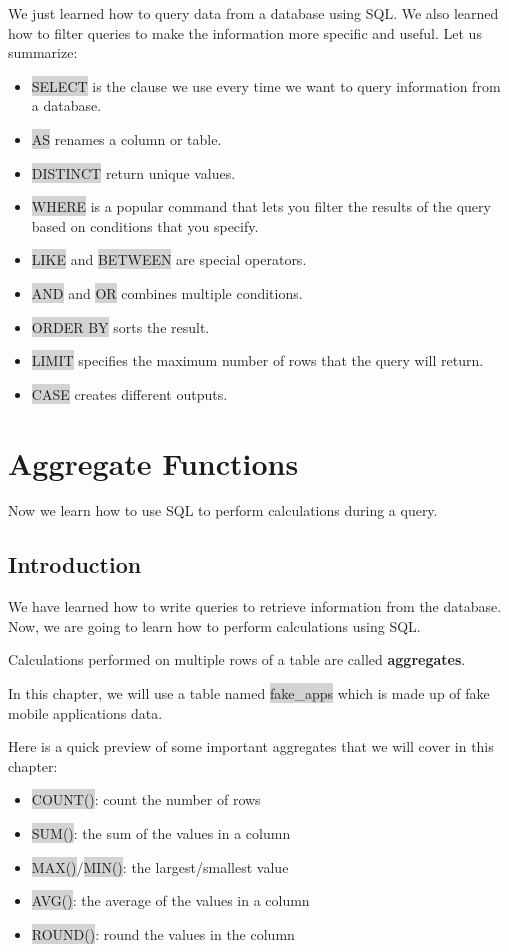 \documentclass[11pt]{article}
\begin{document}
{{We just learned how to query data from a database using SQL. We also learned how to filter queries to make the information more specific and useful. Let us summarize:
\begin{itemize}[leftmargin = *]
\item \colorbox{lightgray}{SELECT} is the clause we use every time we want to query information from a database.
\item \colorbox{lightgray}{AS} renames a column or table.
\item \colorbox{lightgray}{DISTINCT} return unique values.
\item \colorbox{lightgray}{WHERE} is a popular command that lets you filter the results of the query based on conditions that you specify.
\item \colorbox{lightgray}{LIKE} and \colorbox{lightgray}{BETWEEN} are special operators.
\item \colorbox{lightgray}{AND} and \colorbox{lightgray}{OR} combines multiple conditions.
\item \colorbox{lightgray}{ORDER BY} sorts the result.
\item \colorbox{lightgray}{LIMIT} specifies the maximum number of rows that the query will return.
\item \colorbox{lightgray}{CASE} creates different outputs.
\end{itemize}

\newpage
\section{Aggregate Functions}
Now we learn how to use SQL to perform calculations during a query.
\subsection{Introduction}
We have learned how to write queries to retrieve information from the database. Now, we are going to learn how to perform calculations using SQL.

Calculations performed on multiple rows of a table are called \textbf{aggregates}.

In this chapter, we will use a table named \colorbox{lightgray}{fake\_apps} which is made up of fake mobile applications data.

Here is a quick preview of some important aggregates that we will cover in this chapter:
\begin{itemize}[leftmargin = *]
\item \colorbox{lightgray}{COUNT()}: count the number of rows
\item \colorbox{lightgray}{SUM()}: the sum of the values in a column
\item \colorbox{lightgray}{MAX()}/\colorbox{lightgray}{MIN()}: the largest/smallest value
\item \colorbox{lightgray}{AVG()}: the average of the values in a column
\item \colorbox{lightgray}{ROUND()}: round the values in the column
\end{itemize}

}}
\end{document}
